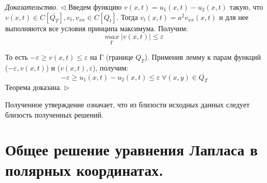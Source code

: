 \documentclass[11pt,a4paper]{article}
\begin{document}
    \textit{Доказательство.} $\triangleleft$ Введем функцию $v(x,t) = u_1(x,t) - u_2(x,t)$ такую, что $v(x,t) \in C[\overline{Q_T}], v_t, v_{xx} \in C[Q_t]$. Тогда $v_t(x,t) = a^2v_{xx}(x,t)$ и для нее выполняются все условия принципа максимума. Получим:
    $$
    \underset{\overline{Г}}{max} \; |v(x,t)| \leqslant \varepsilon
    $$
    
    То есть $-\varepsilon \geqslant v(x,t) \leqslant \varepsilon$ на Г (границе $Q_T$). Применив лемму к парам функций ($-\varepsilon, v(x,t)$) и ($v(x,t), \varepsilon$), получим:
    $$
    -\varepsilon \geqslant u_1(x,t) - u_2(x,t) \leqslant \varepsilon \; \forall (x,y) \in \overline{Q_T}
    $$
    Теорема доказана. $\triangleright$
    
    Полученное утверждение означает, что из близости исходных данных следует близость полученных
решений.
    
    \section{Общее решение уравнения Лапласа в полярных координатах.}
    
    
    
\end{document}
